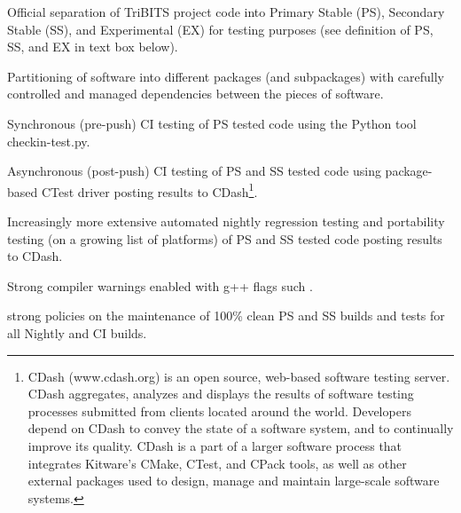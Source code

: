 \documentclass[11pt]{SANDreport}
\begin{document}
\begin{compactitem}

{}\item Official separation of TriBITS project code into Primary Stable (PS), Secondary Stable (SS), and Experimental (EX) for testing purposes (see definition of PS, SS, and EX in text box below).

{}\item Partitioning of software into different packages (and subpackages) with carefully controlled and managed dependencies between the pieces of software.

{}\item Synchronous (pre-push) CI testing of PS tested code using the Python tool checkin-test.py.

{}\item Asynchronous (post-push) CI testing of PS and SS tested code using package-based CTest driver posting results to CDash\footnote{CDash (www.cdash.org) is an open source, web-based software testing server. CDash aggregates, analyzes and displays the results of software testing processes submitted from clients located around the world. Developers depend on CDash to convey the state of a software system, and to continually improve its quality. CDash is a part of a larger software process that integrates Kitware's CMake, CTest, and CPack tools, as well as other external packages used to design, manage and maintain large-scale software systems.}.

{}\item Increasingly more extensive automated nightly regression testing and portability testing (on a growing list of platforms) of PS and SS tested code posting results to CDash.

{}\item Strong compiler warnings enabled with g++ flags such     .

{}\item strong policies on the maintenance of 100\% clean PS and SS builds and tests for all Nightly and CI builds.

\end{compactitem}
\end{document}
